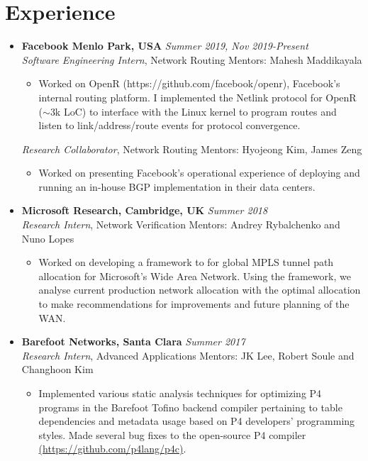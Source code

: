 \documentclass[11pt,a4paper,sans]{moderncv}        %
\begin{document}
\vspace{2pt}

\section{Experience}
\begin{itemize}
	\item \textbf{Facebook Menlo Park, USA} \hfill \emph{Summer 2019, Nov 2019-Present} \\
	\emph{Software Engineering Intern}, Network Routing \hfill Mentors: Mahesh Maddikayala
	\begin{itemize}
		\item Worked on OpenR (https://github.com/facebook/openr), Facebook's internal routing platform. I implemented the
		Netlink protocol for OpenR ($\sim$3k LoC) to interface with the Linux kernel to program routes and listen to link/address/route events
		for protocol convergence.
	\end{itemize}
	\emph{Research Collaborator}, Network Routing \hfill Mentors: Hyojeong Kim, James Zeng
	\begin{itemize}
		\item Worked on presenting Facebook's operational experience of
		deploying and running an in-house BGP implementation in their data centers.
	\end{itemize}
	\vspace*{6pt}

	\item \textbf{Microsoft Research, Cambridge, UK} \hfill \emph{Summer 2018} \\
	\emph{Research Intern}, Network Verification \hfill Mentors: Andrey Rybalchenko and Nuno Lopes
	\begin{itemize}
		\item Worked on developing a framework to for global MPLS tunnel path allocation for Microsoft's
		Wide Area Network. Using the framework, we analyse current production network allocation with
		the optimal allocation to make recommendations for improvements and future planning of the WAN.
	\end{itemize}
	\vspace*{6pt}

	\item \textbf{Barefoot Networks, Santa Clara} \hfill \emph{Summer 2017} \\
	\emph{Research Intern}, Advanced Applications \hfill Mentors: JK Lee, Robert Soule and Changhoon Kim
	\begin{itemize}
		\item Implemented various static analysis techniques for optimizing P4 programs in the Barefoot Tofino backend compiler
		pertaining to table dependencies and metadata usage based on P4
		developers' programming styles. Made several
		bug fixes to the open-source P4 compiler \href{https://github.com/p4lang/p4c}{(https://github.com/p4lang/p4c)}.
	\end{itemize}
	\vspace*{6pt}


\end{itemize}
\end{document}
